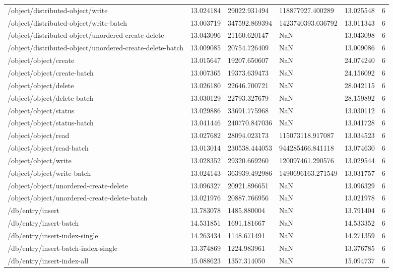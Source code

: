 \begin{tabularx}{\linewidth}{XXXXXX}
/object/distributed-object/write & 13.024184 & 29022.931494 & 118877927.400289 & 13.025548 & 6 \\
/object/distributed-object/write-batch & 13.003719 & 347592.869394 & 1423740393.036792 & 13.011343 & 6 \\
/object/distributed-object/unordered-create-delete & 13.043096 & 21160.620147 & NaN & 13.043098 & 6 \\
/object/distributed-object/unordered-create-delete-batch & 13.009085 & 20754.726409 & NaN & 13.009086 & 6 \\
/object/object/create & 13.015647 & 19207.650607 & NaN & 24.074240 & 6 \\
/object/object/create-batch & 13.007365 & 19373.639473 & NaN & 24.156092 & 6 \\
/object/object/delete & 13.026180 & 22646.700721 & NaN & 28.042115 & 6 \\
/object/object/delete-batch & 13.030129 & 22793.327679 & NaN & 28.159892 & 6 \\
/object/object/status & 13.029886 & 33691.775968 & NaN & 13.030112 & 6 \\
/object/object/status-batch & 13.041446 & 240770.847036 & NaN & 13.041728 & 6 \\
/object/object/read & 13.027682 & 28094.023173 & 115073118.917087 & 13.034523 & 6 \\
/object/object/read-batch & 13.013014 & 230538.444053 & 944285466.841118 & 13.074630 & 6 \\
/object/object/write & 13.028352 & 29320.669260 & 120097461.290576 & 13.029544 & 6 \\
/object/object/write-batch & 13.024143 & 363939.492986 & 1490696163.271549 & 13.031757 & 6 \\
/object/object/unordered-create-delete & 13.096327 & 20921.896651 & NaN & 13.096329 & 6 \\
/object/object/unordered-create-delete-batch & 13.021976 & 20887.766956 & NaN & 13.021978 & 6 \\
/db/entry/insert & 13.783078 & 1485.880004 & NaN & 13.791404 & 6 \\
/db/entry/insert-batch & 14.531851 & 1691.181667 & NaN & 14.533352 & 6 \\
/db/entry/insert-index-single & 14.263434 & 1148.671491 & NaN & 14.271359 & 6 \\
/db/entry/insert-batch-index-single & 13.374869 & 1224.983961 & NaN & 13.376785 & 6 \\
/db/entry/insert-index-all & 15.088623 & 1357.314050 & NaN & 15.094737 & 6 \\

\end{tabularx}
